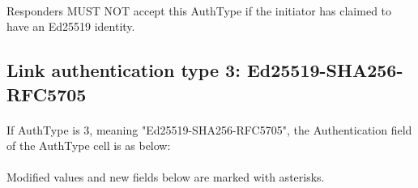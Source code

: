 \paragraph{}
Responders MUST NOT accept this AuthType if the initiator has
claimed to have an Ed25519 identity.

\subsection{Link authentication type 3: Ed25519-SHA256-RFC5705}

\paragraph{}
If AuthType is 3, meaning "Ed25519-SHA256-RFC5705", the
Authentication field of the AuthType cell is as below:

\paragraph{}
Modified values and new fields below are marked with asterisks.

